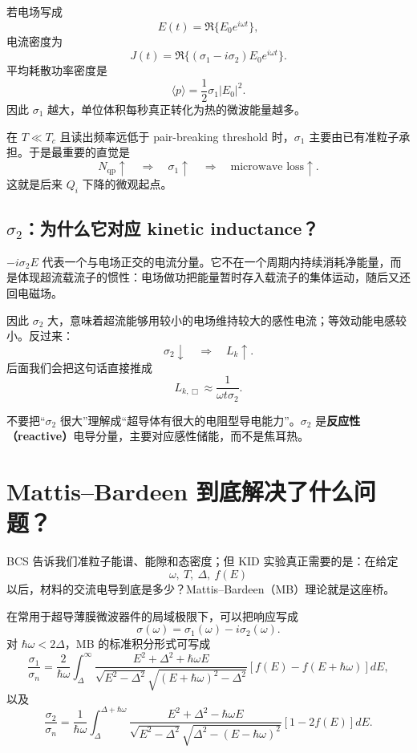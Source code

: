 \documentclass[11pt,a4paper,openany]{ctexrep}
\newcommand{\qp}{\mathrm{qp}}
\begin{document}
若电场写成
\[
E(t)=\Re\{E_0e^{i\omega t}\},
\]
电流密度为
\[
J(t)=\Re\{(\sigma_1-i\sigma_2)E_0e^{i\omega t}\}.
\]
平均耗散功率密度是
\[
\boxed{
\langle p\rangle=\frac12\sigma_1|E_0|^2.
}
\]
因此 $\sigma_1$ 越大，单位体积每秒真正转化为热的微波能量越多。

在 $T\ll T_c$ 且读出频率远低于 pair-breaking threshold 时，$\sigma_1$ 主要由已有准粒子承担。于是最重要的直觉是
\[
\boxed{
N_{\qp}\uparrow\quad\Longrightarrow\quad\sigma_1\uparrow\quad\Longrightarrow\quad\text{microwave loss}\uparrow.
}
\]
这就是后来 $Q_i$ 下降的微观起点。

\subsection{$\sigma_2$：为什么它对应 kinetic inductance？}

$-i\sigma_2E$ 代表一个与电场正交的电流分量。它不在一个周期内持续消耗净能量，而是体现超流载流子的惯性：电场做功把能量暂时存入载流子的集体运动，随后又还回电磁场。

因此 $\sigma_2$ 大，意味着超流能够用较小的电场维持较大的感性电流；等效动能电感较小。反过来：
\[
\boxed{
\sigma_2\downarrow
\quad\Longrightarrow\quad
L_k\uparrow.
}
\]
后面我们会把这句话直接推成
\[
L_{k,\Box}\approx\frac{1}{\omega t\sigma_2}.
\]

\begin{mistakebox}
不要把“$\sigma_2$ 很大”理解成“超导体有很大的电阻型导电能力”。$\sigma_2$ 是\textbf{反应性（reactive）}电导分量，主要对应感性储能，而不是焦耳热。
\end{mistakebox}

\section{Mattis--Bardeen 到底解决了什么问题？}

BCS 告诉我们准粒子能谱、能隙和态密度；但 KID 实验真正需要的是：在给定
\[
\omega,\ T,\ \Delta,\ f(E)
\]
以后，材料的交流电导到底是多少？Mattis--Bardeen（MB）理论就是这座桥。

在常用于超导薄膜微波器件的局域极限下，可以把响应写成
\[
\boxed{
\sigma(\omega)=\sigma_1(\omega)-i\sigma_2(\omega).
}
\]
对 $\hbar\omega<2\Delta$，MB 的标准积分形式可写成
\[
\frac{\sigma_1}{\sigma_n}
=
\frac{2}{\hbar\omega}
\int_{\Delta}^{\infty}
\frac{E^2+\Delta^2+\hbar\omega E}
{\sqrt{E^2-\Delta^2}\sqrt{(E+\hbar\omega)^2-\Delta^2}}
\left[f(E)-f(E+\hbar\omega)\right]dE,
\]
以及
\[
\frac{\sigma_2}{\sigma_n}
=
\frac{1}{\hbar\omega}
\int_{\Delta}^{\Delta+\hbar\omega}
\frac{E^2+\Delta^2-\hbar\omega E}
{\sqrt{E^2-\Delta^2}\sqrt{\Delta^2-(E-\hbar\omega)^2}}
\left[1-2f(E)\right]dE.
\]
\end{document}
